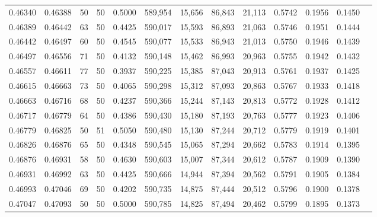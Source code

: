 \begin{tabular}{rrrrrrrrrrrrr}
0.46340 & 0.46388 &    50 &  50 &                                     0.5000 & 589,954 &  15,656 &  86,843 &  21,113 & 0.5742 & 0.1956 & 0.1450 \\
0.46389 & 0.46442 &    63 &  50 &                                     0.4425 & 590,017 &  15,593 &  86,893 &  21,063 & 0.5746 & 0.1951 & 0.1444 \\
0.46442 & 0.46497 &    60 &  50 &                                     0.4545 & 590,077 &  15,533 &  86,943 &  21,013 & 0.5750 & 0.1946 & 0.1439 \\
0.46497 & 0.46556 &    71 &  50 &                                     0.4132 & 590,148 &  15,462 &  86,993 &  20,963 & 0.5755 & 0.1942 & 0.1432 \\
0.46557 & 0.46611 &    77 &  50 &                                     0.3937 & 590,225 &  15,385 &  87,043 &  20,913 & 0.5761 & 0.1937 & 0.1425 \\
0.46615 & 0.46663 &    73 &  50 &                                     0.4065 & 590,298 &  15,312 &  87,093 &  20,863 & 0.5767 & 0.1933 & 0.1418 \\
0.46663 & 0.46716 &    68 &  50 &                                     0.4237 & 590,366 &  15,244 &  87,143 &  20,813 & 0.5772 & 0.1928 & 0.1412 \\
0.46717 & 0.46779 &    64 &  50 &                                     0.4386 & 590,430 &  15,180 &  87,193 &  20,763 & 0.5777 & 0.1923 & 0.1406 \\
0.46779 & 0.46825 &    50 &  51 &                                     0.5050 & 590,480 &  15,130 &  87,244 &  20,712 & 0.5779 & 0.1919 & 0.1401 \\
0.46826 & 0.46876 &    65 &  50 &                                     0.4348 & 590,545 &  15,065 &  87,294 &  20,662 & 0.5783 & 0.1914 & 0.1395 \\
0.46876 & 0.46931 &    58 &  50 &                                     0.4630 & 590,603 &  15,007 &  87,344 &  20,612 & 0.5787 & 0.1909 & 0.1390 \\
0.46931 & 0.46992 &    63 &  50 &                                     0.4425 & 590,666 &  14,944 &  87,394 &  20,562 & 0.5791 & 0.1905 & 0.1384 \\
0.46993 & 0.47046 &    69 &  50 &                                     0.4202 & 590,735 &  14,875 &  87,444 &  20,512 & 0.5796 & 0.1900 & 0.1378 \\
0.47047 & 0.47093 &    50 &  50 &                                     0.5000 & 590,785 &  14,825 &  87,494 &  20,462 & 0.5799 & 0.1895 & 0.1373 \\

\end{tabular}
